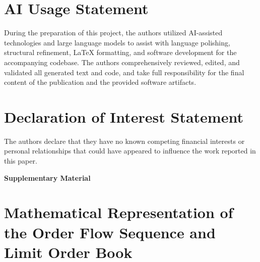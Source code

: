 \documentclass[10pt,a4paper,oneside]{article}
\providecommand{\DIFaddbegin}{} %
\providecommand{\DIFaddend}{} %
\newcommand{\DIFaddincludegraphics}[2][]{{\color{blue}\fbox{\DIFOincludegraphics[#1]{#2}}}} %
\DeclareRobustCommand{\DIFaddbegin}{\DIFOaddbegin \let\includegraphics\DIFaddincludegraphics} %
\DeclareRobustCommand{\DIFaddend}{\DIFOaddend \let\includegraphics\DIFOincludegraphics} %
\begin{document}
\section*{AI Usage Statement}
During the preparation of this project, the authors utilized AI-assisted technologies and large language models to assist with language polishing, structural refinement, LaTeX formatting, and software development for the accompanying codebase. The authors comprehensively reviewed, edited, and validated all generated text and code, and take full responsibility for the final content of the publication and the provided software artifacts.

\section*{Declaration of Interest Statement}
The authors declare that they have no known competing financial interests or personal relationships that could have appeared to influence the work reported in this paper.

\newpage




\newpage

\clearpage
\appendix

\vspace*{2em}
\begin{center}
    \LARGE \textbf{Supplementary Material} \\[0.5em]
\end{center}
\vspace{2em}


\DIFaddbegin \begingroup
{}
\setcounter{tocdepth}{3}
\tableofcontents
\endgroup
\vspace{1em}

\DIFaddend %
\setcounter{table}{0}
\renewcommand{\thetable}{S\arabic{table}}
\setcounter{figure}{0}
\renewcommand{\thefigure}{S\arabic{figure}}
\setcounter{equation}{0}
\renewcommand{\theequation}{S\arabic{equation}}
\setcounter{page}{1} %

\DIFaddbegin \newpage

\DIFaddend \section{Mathematical Representation of the Order Flow Sequence and Limit Order Book}
\label{ap:matreplob}
\end{document}
